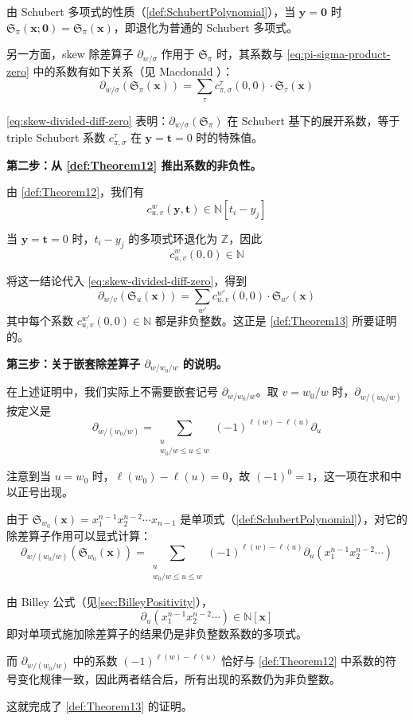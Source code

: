 由 Schubert 多项式的性质（\cref{def:SchubertPolynomial}），当 $\mathbf{y} = \mathbf{0}$ 时 $\mathfrak{S}_\pi(\mathbf{x}; \mathbf{0}) = \mathfrak{S}_\pi(\mathbf{x})$，即退化为普通的 Schubert 多项式。

另一方面，skew 除差算子 $\partial_{w/\sigma}$ 作用于 $\mathfrak{S}_\pi$ 时，其系数与 \cref{eq:pi-sigma-product-zero} 中的系数有如下关系（见 Macdonald \cite[Section 5]{macdonald1991}）：
$$\partial_{w/\sigma}(\mathfrak{S}_\pi(\mathbf{x})) = \sum_\tau c^\tau_{\pi,\sigma}(0, 0) \cdot \mathfrak{S}_\tau(\mathbf{x}) \label{eq:skew-divided-diff-zero}$$

\cref{eq:skew-divided-diff-zero} 表明：$\partial_{w/\sigma}(\mathfrak{S}_\pi)$ 在 Schubert 基下的展开系数，等于 triple Schubert 系数 $c^\tau_{\pi,\sigma}$ 在 $\mathbf{y} = \mathbf{t} = 0$ 时的特殊值。

\medskip
\noindent\textbf{第二步：从 \cref{def:Theorem12} 推出系数的非负性。}

由 \cref{def:Theorem12}，我们有
$$c^w_{u,v}(\mathbf{y}, \mathbf{t}) \in \mathbb{N}[t_i - y_j]$$

当 $\mathbf{y} = \mathbf{t} = 0$ 时，$t_i - y_j$ 的多项式环退化为 $\mathbb{Z}$，因此
$$c^w_{u,v}(0, 0) \in \mathbb{N}$$

将这一结论代入 \cref{eq:skew-divided-diff-zero}，得到
$$\partial_{w/v}(\mathfrak{S}_u(\mathbf{x})) = \sum_{w'} c^{w'}_{u,v}(0, 0) \cdot \mathfrak{S}_{w'}(\mathbf{x})$$
其中每个系数 $c^{w'}_{u,v}(0, 0) \in \mathbb{N}$ 都是非负整数。这正是 \cref{def:Theorem13} 所要证明的。

\medskip
\noindent\textbf{第三步：关于嵌套除差算子 $\partial_{w/w_0/w}$ 的说明。}

在上述证明中，我们实际上不需要嵌套记号 $\partial_{w/w_0/w}$。取 $v = w_0 / w$ 时，$\partial_{w/(w_0/w)}$ 按定义是
$$\partial_{w/(w_0/w)} = \sum_{\substack{u \\ w_0/w \leq u \leq w}} (-1)^{\ell(w)-\ell(u)} \partial_u$$

注意到当 $u = w_0$ 时，$\ell(w_0) - \ell(u) = 0$，故 $(-1)^0 = 1$，这一项在求和中以正号出现。

由于 $\mathfrak{S}_{w_0}(\mathbf{x}) = x_1^{n-1}x_2^{n-2}\cdots x_{n-1}$ 是单项式（\cref{def:SchubertPolynomial}），对它的除差算子作用可以显式计算：
$$\partial_{w/(w_0/w)}(\mathfrak{S}_{w_0}(\mathbf{x})) = \sum_{\substack{u \\ w_0/w \leq u \leq w}} (-1)^{\ell(w)-\ell(u)} \partial_u(x_1^{n-1}x_2^{n-2}\cdots)$$

由 Billey 公式（见\cref{sec:BilleyPositivity}），
$$\partial_u(x_1^{n-1}x_2^{n-2}\cdots) \in \mathbb{N}[\mathbf{x}]$$
即对单项式施加除差算子的结果仍是非负整数系数的多项式。

而 $\partial_{w/(w_0/w)}$ 中的系数 $(-1)^{\ell(w)-\ell(u)}$ 恰好与 \cref{def:Theorem12} 中系数的符号变化规律一致，因此两者结合后，所有出现的系数仍为非负整数。

这就完成了 \cref{def:Theorem13} 的证明。



